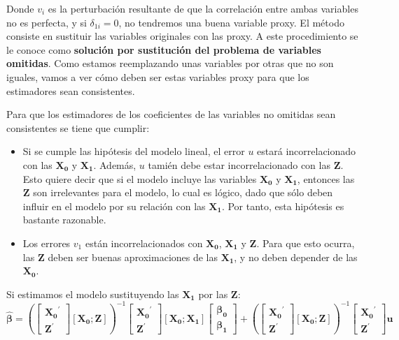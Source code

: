 Donde $v_i$ es la perturbaci\'on resultante de que la correlaci\'on entre ambas variables no es perfecta, y si $\delta_{1i}=0$, no tendremos una buena variable proxy. El m\'etodo consiste en sustituir las variables originales con las proxy. A este procedimiento se le conoce como \textbf{soluci\'on por sustituci\'on del problema de variables omitidas}. Como estamos reemplazando unas variables por otras que no son iguales, vamos a ver c\'omo deben ser estas variables proxy para que los estimadores sean consistentes.

Para que los estimadores de los coeficientes de las variables no omitidas sean consistentes se tiene que cumplir:
\begin{itemize}
\item Si se cumple las hip\'otesis del modelo lineal, el error $u$ estar\'a incorrelacionado con las $\boldsymbol{X_0}$ y $\boldsymbol{X_1}$. Adem\'as, $u$ tami\'en debe estar incorrelacionado con las $\boldsymbol{Z}$. Esto quiere decir que si el modelo incluye las variables $\boldsymbol{X_0}$ y $\boldsymbol{X_1}$, entonces las $\boldsymbol{Z}$ son irrelevantes para el modelo, lo cual es l\'ogico, dado que s\'olo deben influir en el modelo por su relaci\'on con las $\boldsymbol{X_1}$. Por tanto, esta hip\'otesis es bastante razonable.
\item Los errores $v_1$ est\'an incorrelacionados con $\boldsymbol{X_0}$, $\boldsymbol{X_1}$ y $\boldsymbol{Z}$. Para que esto ocurra, las $\boldsymbol{Z}$ deben ser buenas aproximaciones de las $\boldsymbol{X_1}$, y no deben depender de las $\boldsymbol{X_0}$.
\end{itemize}

Si estimamos el modelo sustituyendo las $\boldsymbol{X_1}$ por las $\boldsymbol{Z}$:
\[\hat{\boldsymbol{\beta}}=\left(\left[\begin{matrix}
\boldsymbol{X_0}^{\prime} \\
\boldsymbol{Z}^{\prime}
\end{matrix}\right]\left[\boldsymbol{X_0}; \boldsymbol{Z}\right]\right)^{-1}\left[\begin{matrix}
\boldsymbol{X_0}^{\prime} \\
\boldsymbol{Z}^{\prime}
\end{matrix}\right]\left[\boldsymbol{X_0}; \boldsymbol{X_1}\right]\left[\begin{matrix}
\boldsymbol{\beta_0} \\
\boldsymbol{\beta_1}
\end{matrix}\right]+\left(\left[\begin{matrix}
\boldsymbol{X_0}^{\prime} \\
\boldsymbol{Z}^{\prime}
\end{matrix}\right]\left[\boldsymbol{X_0}; \boldsymbol{Z}\right]\right)^{-1}\left[\begin{matrix}
\boldsymbol{X_0}^{\prime} \\
\boldsymbol{Z}^{\prime}
\end{matrix}\right]\boldsymbol{u}\]

